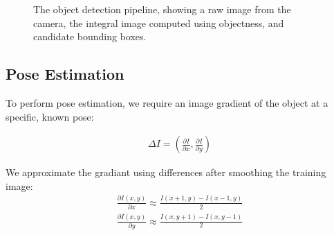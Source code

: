 \documentclass[conference]{IEEEtran}
\begin{document}
\begin{figure}
%
%
%
\caption{The object detection pipeline, showing a raw image from the
  camera, the integral image computed using objectness, and candidate
  bounding boxes.\label{fig:object_detection}}
\end{figure}



 
\subsection{Pose Estimation}

To perform pose estimation, we require an image gradient of the object
at a specific, known pose:

\begin{align}
\Delta I = \left( \frac{\partial I}{\partial x}, \frac{\partial I}{\partial y} \right)
\end{align}

We approximate the gradiant using differences after smoothing the
training image:
\begin{align}
\frac{\partial I(x, y)}{\partial x} \approx \frac{I(x + 1, y) - I(x - 1, y)}{2}\\
\frac{\partial I(x, y)}{\partial y} \approx \frac{I(x, y + 1) - I(x, y - 1)}{2}
\end{align}
\end{document}
